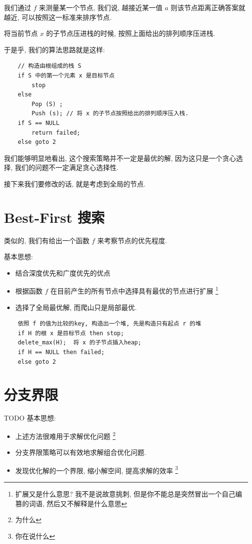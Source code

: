 \documentclass[a4paper, 10pt]{ctexbook} %
\begin{document}
我们通过 $f$ 来测量某一个节点, 我们说, 越接近某一值 $a$ 则该节点距离正确答案就越近, 可以按照这一标准来排序节点. 

将当前节点 $x$ 的子节点压进栈的时候, 按照上面给出的排列顺序压进栈. 

于是乎, 我们的算法思路就是这样:
\begin{verbatim}
    // 构造由根组成的栈 S
    if S 中的第一个元素 x 是目标节点
        stop
    else 
        Pop (S) ; 
        Push (s); // 将 x 的子节点按照给出的排列顺序压入栈.
    if S == NULL 
        return failed;
    else goto 2
\end{verbatim}

我们能够明显地看出, 这个搜索策略并不一定是最优的解, 因为这只是一个贪心选择, 我们的问题不一定满足贪心选择性. 

接下来我们要修改的话, 就是考虑到全局的节点.
\section{Best-First 搜索}

类似的, 我们有给出一个函数 $f$ 来考察节点的优先程度.

基本思想: 
\begin{itemize}
    \item 结合深度优先和广度优先的优点
    \item 根据函数 $f$ 在目前产生的所有节点中选择具有最优的节点进行扩展 \footnote{扩展又是什么意思? 我不是说故意挑刺, 但是你不能总是突然冒出一个自己编篡的词语, 然后又不解释是什么意思}
    \item 选择了全局最优解, 而爬山只是局部最优.
\end{itemize}
\begin{verbatim}
    依照 f 的值为比较的key, 构造出一个堆, 先是构造只有起点 r 的堆
    if H 的根 x 是目标节点 then stop;
    delete_max(H);  将 x 的子节点插入heap;
    if H == NULL then failed;
    else goto 2
\end{verbatim}
\section{分支界限}
TODO
基本思想: 
\begin{itemize}
    \item 上述方法很难用于求解优化问题 \footnote{为什么}
    \item 分支界限策略可以有效地求解组合优化问题. 
    \item 发现优化解的一个界限, 缩小解空间, 提高求解的效率 \footnote{你在说什么}
\end{itemize}
\end{document}
